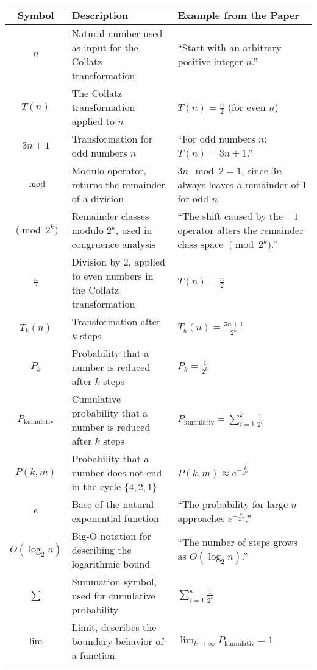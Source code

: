 \documentclass[a4paper,12pt]{article}
\begin{document}
\begin{table}[h!]
    \centering
    \begin{tabular}{|c|p{7cm}|p{5cm}|}
    \hline
    \textbf{Symbol} & \textbf{Description} & \textbf{Example from the Paper} \\ \hline
    \( n \) & Natural number used as input for the Collatz transformation & “Start with an arbitrary positive integer \( n \).” \\ \hline
    \( T(n) \) & The Collatz transformation applied to \( n \) & \( T(n) = \frac{n}{2} \) (for even \( n \)) \\ \hline
    \( 3n + 1 \) & Transformation for odd numbers \( n \) & “For odd numbers \( n \): \( T(n) = 3n + 1 \).” \\ \hline
    \( \mod \) & Modulo operator, returns the remainder of a division & \( 3n \mod 2 = 1 \), since \( 3n \) always leaves a remainder of 1 for odd \( n \) \\ \hline
    \( \pmod{2^k} \) & Remainder classes modulo \( 2^k \), used in congruence analysis & “The shift caused by the \(+1\) operator alters the remainder class space \( \pmod{2^k} \).” \\ \hline
    \( \frac{n}{2} \) & Division by 2, applied to even numbers in the Collatz transformation & \( T(n) = \frac{n}{2} \) \\ \hline
    \( T_k(n) \) & Transformation after \( k \) steps & \( T_k(n) = \frac{3n + 1}{2^k} \) \\ \hline
    \( P_k \) & Probability that a number is reduced after \( k \) steps & \( P_k = \frac{1}{2^k} \) \\ \hline
    \( P_{\text{kumulativ}} \) & Cumulative probability that a number is reduced after \( k \) steps & \( P_{\text{kumulativ}} = \sum_{i=1}^k \frac{1}{2^i} \) \\ \hline
    \( P(k, m) \) & Probability that a number does not end in the cycle \( \{4,2,1\} \) & \( P(k,m) \approx e^{-\frac{k}{2^m}} \) \\ \hline
    \( e \) & Base of the natural exponential function & “The probability for large \( n \) approaches \( e^{-\frac{k}{2^m}} \).” \\ \hline
    \( O(\log_2 n) \) & Big-O notation for describing the logarithmic bound & “The number of steps grows as \( O(\log_2 n) \).” \\ \hline
    \( \sum \) & Summation symbol, used for cumulative probability & \( \sum_{i=1}^k \frac{1}{2^i} \) \\ \hline
    \( \lim \) & Limit, describes the boundary behavior of a function & \( \lim_{k \to \infty} P_{\text{kumulativ}} = 1 \) \\ \hline

\end{tabular}
\end{table}
\end{document}
